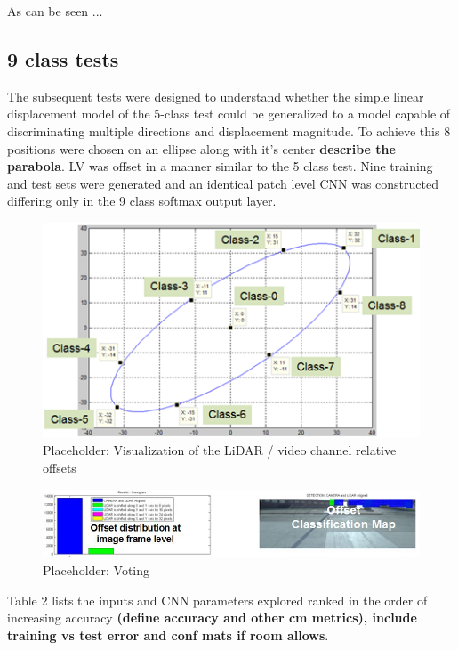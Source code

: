 \documentclass{article}
\begin{document}
As can be seen ... 


\subsection{9 class tests} %
\label{sub:9_class_tests}
The subsequent tests were designed to understand whether the simple linear displacement model of the 5-class test could be generalized to a model capable of discriminating multiple directions and displacement magnitude. To achieve this 8 positions were chosen on an ellipse along with it's center \textbf{describe the parabola}. LV was offset in a manner similar to the 5 class test. Nine training and test sets were generated and an identical patch level CNN was constructed differing only in the 9 class softmax output layer. 

\begin{figure}[htbp]
    \centering
        \includegraphics[scale=0.85]{Figures/ellipse.png}
    \caption{Placeholder: Visualization of the LiDAR / video channel relative offsets}
    \label{fig:Figures_Ellipse}
\end{figure}

\begin{figure}[htbp]
    \centering
        \includegraphics[scale=0.85]{Figures/Voting_5class.jpg}
    \caption{Placeholder: Voting}
    \label{fig:Figures_Voting}
\end{figure}

Table 2 lists the inputs and CNN parameters explored ranked in the order of increasing accuracy \textbf{(define accuracy and other cm metrics), include training vs test error and conf mats if room allows}.  
\end{document}
